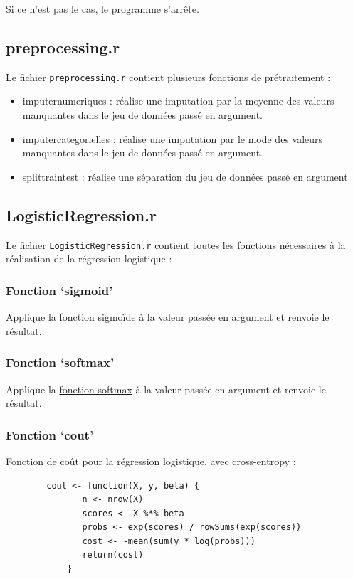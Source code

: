 \documentclass[10pt,french]{report}
\begin{document}
	Si ce n'est pas le cas, le programme s'arrête.

	\subsection{preprocessing.r}

	Le fichier \texttt{preprocessing.r} contient plusieurs fonctions de prétraitement :

	\begin{itemize}
		\item imputer\textunderscore numeriques : réalise une imputation par la moyenne des valeurs manquantes dans le jeu de données passé en argument.
		\item imputer\textunderscore categorielles : réalise une imputation par le mode des valeurs manquantes dans le jeu de données passé en argument.
		\item split\textunderscore train\textunderscore test : réalise une séparation du jeu de données passé en argument
	\end{itemize}

	\subsection{LogisticRegression.r}

	Le fichier \texttt{LogisticRegression.r} contient toutes les fonctions nécessaires à la réalisation de la régression logistique :

	\subsubsection{Fonction \enquote*{sigmoid}}
	Applique la \hyperref[fonction sigmoïde]{fonction sigmoïde} à la valeur passée en argument et renvoie le résultat.

	\subsubsection{Fonction \enquote*{softmax}}
	Applique la \hyperref[fonction softmax]{fonction softmax} à la valeur passée en argument et renvoie le résultat.

	\subsubsection{Fonction \enquote*{cout}}
	Fonction de coût pour la régression logistique, avec cross-entropy :

	\begin{verbatim}
		cout <- function(X, y, beta) {
			   n <- nrow(X)
			   scores <- X %*% beta
			   probs <- exp(scores) / rowSums(exp(scores))
			   cost <- -mean(sum(y * log(probs)))
			   return(cost)
		    }
	\end{verbatim}
\end{document}
